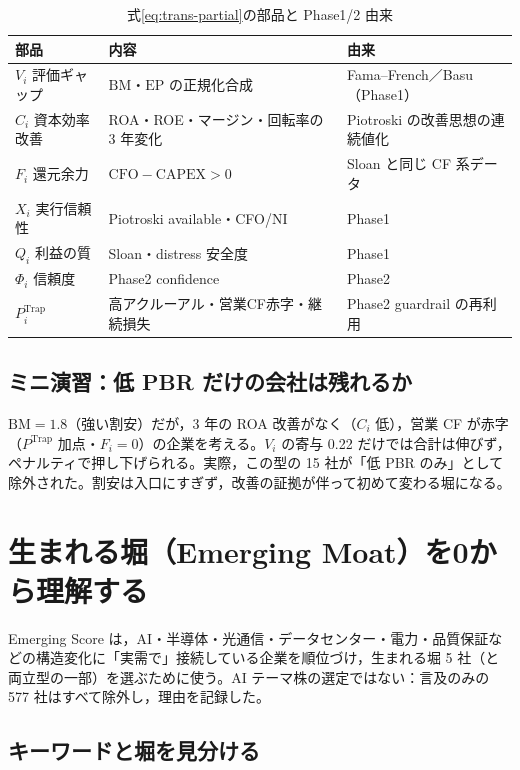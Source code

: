 \documentclass[a4paper,10pt]{article}
\newcommand{\metric}[1]{\mathrm{#1}}
\begin{document}
\begin{table}[H]
\caption{式\eqref{eq:trans-partial}の部品と Phase1/2 由来}
\centering
\small
\begin{tabularx}{\linewidth}{p{30mm}Y p{42mm}}
\toprule
部品 & 内容 & 由来 \\
\midrule
$V_i$ 評価ギャップ & $\metric{BM}$・$\metric{EP}$ の正規化合成 & Fama--French／Basu（Phase1） \\
$C_i$ 資本効率改善 & ROA・ROE・マージン・回転率の 3 年変化 & Piotroski の改善思想の連続値化 \\
$F_i$ 還元余力 & $\metric{CFO}-\metric{CAPEX}>0$ & Sloan と同じ CF 系データ \\
$X_i$ 実行信頼性 & Piotroski available・CFO/NI & Phase1 \\
$Q_i$ 利益の質 & Sloan・distress 安全度 & Phase1 \\
$\Phi_i$ 信頼度 & Phase2 confidence & Phase2 \\
$P^{\mathrm{Trap}}_i$ & 高アクルーアル・営業CF赤字・継続損失 & Phase2 guardrail の再利用 \\
\bottomrule
\end{tabularx}
\end{table}

\subsection{ミニ演習：低 PBR だけの会社は残れるか}

$\metric{BM}=1.8$（強い割安）だが，3 年の ROA 改善がなく（$C_i$ 低），営業 CF が赤字（$P^{\mathrm{Trap}}$ 加点・$F_i=0$）の企業を考える。$V_i$ の寄与 0.22 だけでは合計は伸びず，ペナルティで押し下げられる。実際，この型の 15 社が「低 PBR のみ」として除外された。割安は入口にすぎず，改善の証拠が伴って初めて変わる堀になる。

\section{生まれる堀（Emerging Moat）を0から理解する}
\label{sec:emerg}

\begin{keybox}[フローでの位置]
Emerging Score は，AI・半導体・光通信・データセンター・電力・品質保証などの構造変化に「実需で」接続している企業を順位づけ，生まれる堀 5 社（と両立型の一部）を選ぶために使う。AI テーマ株の選定ではない：言及のみの 577 社はすべて除外し，理由を記録した。
\end{keybox}

\subsection{キーワードと堀を見分ける}
\end{document}
